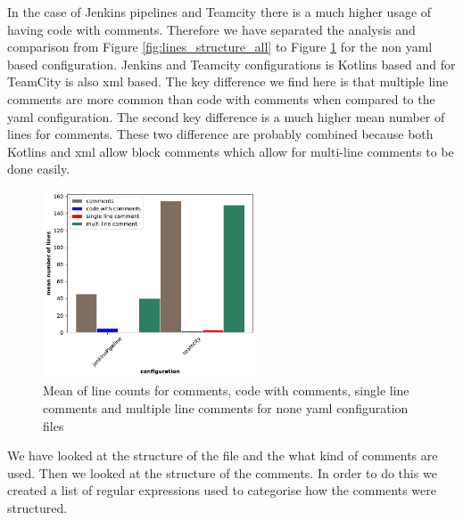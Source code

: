 \documentclass[10pt,conference]{IEEEtran}
\begin{document}
In the case of Jenkins pipelines and Teamcity there is a much higher usage of having code with comments. Therefore we have separated the analysis and comparison from Figure \ref{fig:lines_structure_all} to Figure \ref{fig:lines_structure_none_yaml} for the non yaml based configuration. Jenkins and Teamcity configurations is Kotlins based and for TeamCity is also xml based. The key difference we find here is that multiple line comments are more common than code with comments when compared to the yaml configuration. The second key difference is a much higher mean number of lines for comments. These two difference are probably combined because both Kotlins and xml allow block comments which allow for multi-line comments to be done easily. 
\begin{figure}[!ht]
  \centering
  \includegraphics[width=2.5in]{../src/results/line structure none yaml comments.pdf}
  \caption[alt text]{Mean of line counts for comments, code with comments, single line comments and multiple line comments for none yaml configuration files}
  \label{fig:lines_structure_none_yaml}
\end{figure}

We have looked at the structure of the file and the what kind of comments are used. Then we looked at the structure of the comments. In order to do this we created a list of regular expressions used to categorise how the comments were structured. 
\end{document}
